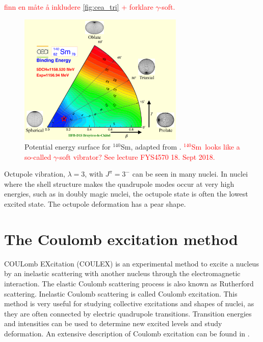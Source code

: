 \documentclass[twoside,english]{uiofysmaster/uiofysmaster}
\newcommand{\Sm}{$^{140}$Sm} %
\newcommand{\ga}{$\gamma$}
\let\orgautoref\autoref
\renewcommand{\autoref}
        {%
		 \def\sectionautorefname{Section}%
		 \def\subsectionautorefname{Section}%
		 \def\subsubsectionautorefname{Section}%
		 \def\chapterautorefname{Chapter}%
          \orgautoref}
\begin{document}
\textcolor{red}{finn en måte å inkludere \autoref{fig:cea_tri} + forklare \ga-soft.}

\begin{figure}[ht]
	\centering
	\includegraphics[width=0.7\textwidth]{Images/Triaxial-map-drawing.png}
	\caption{Potential energy surface for \Sm, adapted from \cite{Hilaire2007, CEA}. \textcolor{red}{\Sm\ looks like a so-called \ga-soft vibrator? See lecture FYS4570 18. Sept 2018.}}
	\label{fig:cea_tri}
\end{figure}

Octupole vibration, $\lambda = 3$, with $J^\pi = 3^-$ can be seen in many nuclei.
In nuclei where the shell structure makes the quadrupole modes occur at very high energies, such as in doubly magic nuclei, the octupole state is often the lowest excited state.
The octupole deformation has a pear shape.



\section{The Coulomb excitation method}\label{sec:Coulex}
COULomb EXcitation (COULEX) is an experimental method to excite a nucleus by an inelastic scattering with another nucleus through the electromagnetic interaction. 
The elastic Coulomb scattering process is also known as Rutherford scattering.
Inelastic Coulomb scattering is called Coulomb excitation.
This method is very useful for studying collective excitations and shapes of nuclei, as they are often connected by electric quadrupole transitions.  
Transition energies and intensities can be used to determine new excited levels and study deformation.
An extensive description of Coulomb excitation can be found in \cite{Alder1956, EE-Coulex, Bertulani2009}.
\end{document}

